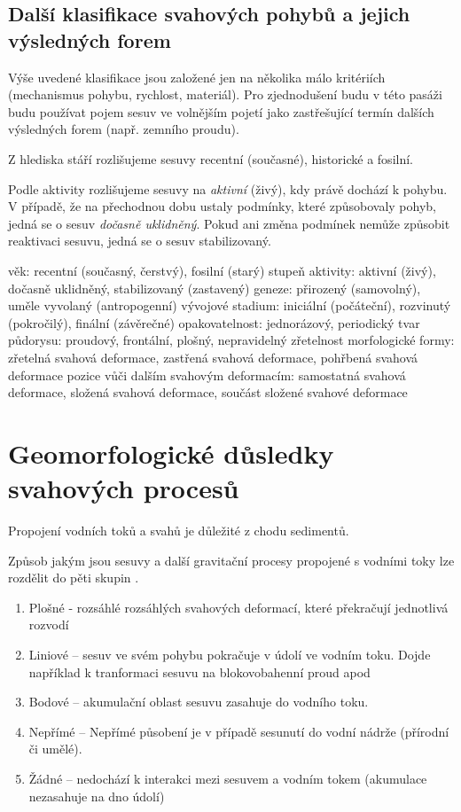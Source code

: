 \subsection{Další klasifikace svahových pohybů a jejich výsledných forem}
Výše uvedené klasifikace jsou založené jen na několika málo kritériích (mechanismus pohybu, rychlost, materiál). Pro zjednodušení budu v této pasáži budu používat pojem sesuv ve volnějším pojetí jako zastřešující termín dalších výsledných forem (např. zemního proudu).

Z hlediska stáří rozlišujeme sesuvy recentní (současné), historické a fosilní.

Podle aktivity rozlišujeme sesuvy na \emph{aktivní} (živý), kdy právě dochází k pohybu. V případě, že na přechodnou dobu ustaly podmínky, které způsobovaly pohyb, jedná se o sesuv \emph{dočasně uklidněný}. Pokud ani změna podmínek nemůže způsobit reaktivaci sesuvu, jedná se o sesuv stabilizovaný.

věk: recentní (současný, čerstvý), fosilní (starý)
stupeň aktivity: aktivní (živý), dočasně uklidněný, stabilizovaný (zastavený)
geneze: přirozený (samovolný), uměle vyvolaný (antropogenní)
vývojové stadium: iniciální (počáteční), rozvinutý (pokročilý), finální (závěrečné)
opakovatelnost: jednorázový, periodický
tvar půdorysu: proudový, frontální, plošný, nepravidelný
zřetelnost morfologické formy: zřetelná svahová deformace, zastřená svahová deformace, pohřbená svahová deformace
pozice vůči dalším svahovým deformacím: samostatná svahová deformace, složená svahová deformace, součást složené svahové deformace


\section{Geomorfologické důsledky svahových procesů}
Propojení vodních toků a svahů je důležité z chodu sedimentů. 


Způsob jakým jsou sesuvy a další gravitační procesy propojené s vodními toky lze rozdělit do pěti skupin \parencite{korupGeomorphicImprintLandslides2005}. 

\begin{enumerate}
	\item Plošné - rozsáhlé rozsáhlých svahových deformací, které překračují jednotlivá rozvodí
	\item Liniové -- sesuv ve svém pohybu pokračuje v údolí ve vodním toku. Dojde například k tranformaci sesuvu na blokovobahenní proud apod
	\item Bodové -- akumulační oblast sesuvu zasahuje do vodního toku.
	\item Nepřímé -- Nepřímé působení je v případě sesunutí do vodní nádrže (přírodní či umělé).
	\item Žádné -- nedochází k interakci mezi sesuvem a vodním tokem (akumulace nezasahuje na dno údolí)
\end{enumerate}

